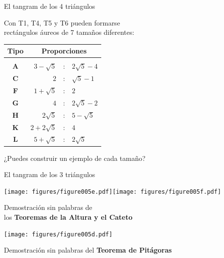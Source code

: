 \documentclass[14pt,aspectratio=169,usenames,dvipsnames]{beamer}
\begin{document}
    \begin{frame}{El tangram de los 4 triángulos}
        \begin{center}
            Con T1, T4, T5 y T6 pueden formarse\\[0.5ex]rectángulos áureos de 7 tamaños diferentes:

            \bigskip\medskip

            {\small\begin{tabular}{c|rcl}
                \textbf{Tipo} & \multicolumn{3}{c}{\textbf{Proporciones}} \\[0.5ex]\hline&&&\\[-1.5ex]
                \textbf{A} & $3\!-\!\sqrt{5}$  &\!\!\!\!:\!\!\!\!& $2\sqrt{5}\!-\!4$ \\
                \textbf{C} & $2$               &\!\!\!\!:\!\!\!\!& $\sqrt{5}\!-\!1$  \\
                \textbf{F} & $1\!+\!\sqrt{5}$  &\!\!\!\!:\!\!\!\!& $2$               \\
                \textbf{G} & $4$               &\!\!\!\!:\!\!\!\!& $2\sqrt{5}\!-\!2$ \\
                \textbf{H} & $2\sqrt{5}$       &\!\!\!\!:\!\!\!\!& $5\!-\!\sqrt{5}$  \\
                \textbf{K} & $2\!+\!2\sqrt{5}$ &\!\!\!\!:\!\!\!\!& $4$               \\
                \textbf{L} & $5\!+\!\sqrt{5}$  &\!\!\!\!:\!\!\!\!& $2\sqrt{5}$       \\
            \end{tabular}}

            \bigskip\medskip

            ¿Puedes construir un ejemplo de cada tamaño?
        \end{center}
    \end{frame}


    \begin{frame}{El tangram de los 3 triángulos}
        \begin{center}
            \texttt{[image: figures/figure005e.pdf]}\qquad\texttt{[image: figures/figure005f.pdf]}

            \bigskip
            Demostración sin palabras de\\los \textbf{Teoremas de la Altura y el Cateto}
            \bigskip \bigskip

            \texttt{[image: figures/figure005d.pdf]}

            \bigskip
            Demostración sin palabras del \textbf{Teorema de Pitágoras}
            \bigskip
        \end{center}
    \end{frame}
\end{document}
